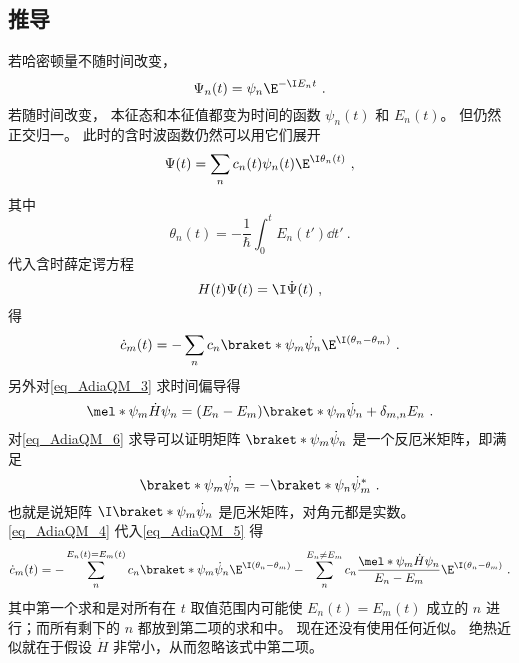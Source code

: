 \subsection{推导}
若哈密顿量不随时间改变，
\begin{equation}
\Psi_n(t) = \psi_n \E^{-\I E_n t}~.
\end{equation}
若随时间改变， 本征态和本征值都变为时间的函数 $\psi_n(t)$ 和 $E_n(t)$。 但仍然正交归一。 此时的含时波函数仍然可以用它们展开
\begin{equation}
\Psi(t) = \sum_n c_n(t) \psi_n(t) \E^{\I \theta_n(t)}~,
\end{equation}
其中
\begin{equation}
\theta_n(t) = -\frac{1}{\hbar} \int_0^t E_n(t')\dd{t'}~.
\end{equation}
代入含时薛定谔方程
\begin{equation}\label{eq_AdiaQM_1}
H(t)\Psi(t) = \I \dot \Psi(t)~,
\end{equation}
得
\begin{equation}\label{eq_AdiaQM_5}
\dot c_m(t) = -\sum_n c_n \braket*{\psi_m}{\dot\psi_n}\E^{\I(\theta_n-\theta_m)}~.
\end{equation}
另外对\autoref{eq_AdiaQM_3} 求时间偏导得
\begin{equation}\label{eq_AdiaQM_4}
\mel*{\psi_m}{\dot H}{\psi_n} = (E_n-E_m)\braket*{\psi_m}{\dot\psi_n} + \delta_{m,n}E_n~.
\end{equation}
对\autoref{eq_AdiaQM_6} 求导可以证明矩阵 $\braket*{\psi_m}{\dot\psi_n}$ 是一个反厄米矩阵，即满足
\begin{equation}\label{eq_AdiaQM_7}
\braket*{\psi_m}{\dot\psi_n} = -\braket*{\psi_n}{\dot\psi_m}^*~.
\end{equation}
也就是说矩阵 $\I\braket*{\psi_m}{\dot\psi_n}$ 是厄米矩阵，对角元都是实数。
\autoref{eq_AdiaQM_4} 代入\autoref{eq_AdiaQM_5} 得
\begin{equation}\label{eq_AdiaQM_8}
\dot c_m(t) = - \sum_{n}^{E_n(t)=E_m(t)} c_n \braket*{\psi_m}{\dot\psi_n}\E^{\I(\theta_n-\theta_m)}
- \sum_{n}^{E_n\ne E_m} c_n \frac{\mel*{\psi_m}{\dot H}{\psi_n}}{E_n-E_m}\E^{\I(\theta_n-\theta_m)}~.
\end{equation}
其中第一个求和是对所有在 $t$ 取值范围内可能使 $E_n(t)=E_m(t)$ 成立的 $n$ 进行；而所有剩下的 $n$ 都放到第二项的求和中。 现在还没有使用任何近似。 绝热近似就在于假设 $\dot H$ 非常小，从而忽略该式中第二项。

